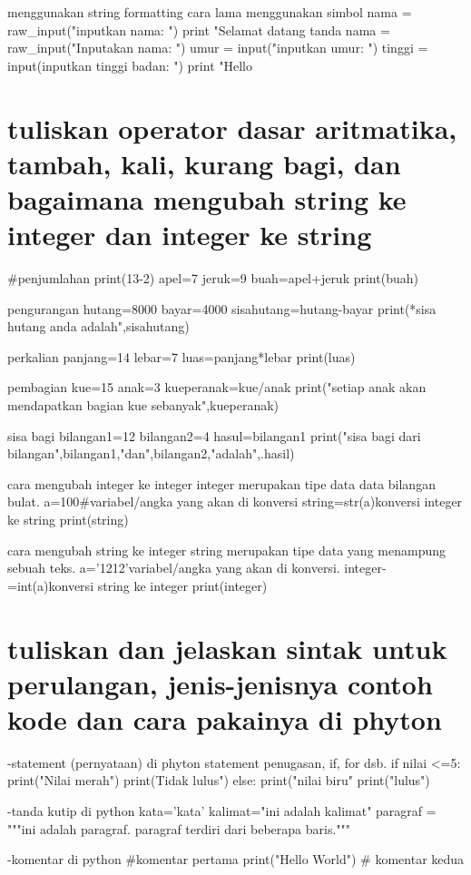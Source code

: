 \begin{enumerate}
\begin{enumerate}
menggunakan string formatting cara lama
menggunakan simbol %
nama = raw_input("inputkan nama: ")
print "Selamat datang %
tanda %
nama = raw_input("Inputakan nama: ")
umur = input("inputkan umur: ")
tinggi = input(inputkan tinggi badan: ")
print "Hello %


\section{tuliskan operator dasar aritmatika, tambah, kali, kurang bagi, dan bagaimana mengubah string ke integer dan integer ke string}
#penjumlahan
print(13-2)
apel=7
jeruk=9
buah=apel+jeruk
print(buah)

pengurangan
hutang=8000
bayar=4000
sisahutang=hutang-bayar
print(*sisa hutang anda adalah",sisahutang)

perkalian
panjang=14
lebar=7
luas=panjang*lebar
print(luas)

pembagian
kue=15
anak=3
kueperanak=kue/anak
print("setiap anak akan mendapatkan bagian kue sebanyak",kueperanak)

sisa bagi
bilangan1=12
bilangan2=4
hasul=bilangan1%
print("sisa bagi dari bilangan",bilangan1,"dan",bilangan2,"adalah",.hasil)

cara mengubah integer ke integer
integer merupakan tipe data data bilangan bulat.
a=100#variabel/angka yang akan di konversi
string=str(a)konversi integer ke string
print(string)

cara mengubah string ke integer
string merupakan tipe data yang menampung sebuah teks.
a='1212'variabel/angka yang akan di konversi.
integer-=int(a)konversi string ke integer
print(integer)


\section{tuliskan dan jelaskan sintak untuk perulangan, jenis-jenisnya contoh kode dan cara pakainya di phyton}
-statement (pernyataan) di phyton
statement penugasan, if, for dsb.
if nilai <=5:
    print("Nilai merah")
    print(Tidak lulus")
else:
    print("nilai biru"
    print("lulus")

-tanda kutip di python
kata='kata'
kalimat="ini adalah kalimat"
paragraf = """ini adalah paragraf.
paragraf terdiri dari beberapa baris."""

-komentar di python
#komentar pertama
print("Hello World") # komentar kedua



\end{enumerate}
\end{enumerate}

